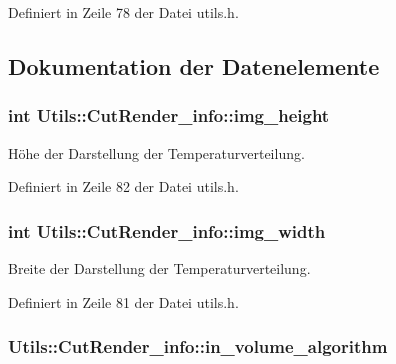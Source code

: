 Definiert in Zeile 78 der Datei utils.\-h.



\subsection{Dokumentation der Datenelemente}
\hypertarget{structUtils_1_1CutRender__info_abac1c3e4edb7183017ecfa7b69c40d25}{
\subsubsection[{img\-\_\-height}]{\setlength{\rightskip}{0pt plus 5cm}int Utils\-::\-Cut\-Render\-\_\-info\-::img\-\_\-height}}\label{structUtils_1_1CutRender__info_abac1c3e4edb7183017ecfa7b69c40d25}


Höhe der Darstellung der Temperaturverteilung. 



Definiert in Zeile 82 der Datei utils.\-h.

\hypertarget{structUtils_1_1CutRender__info_ac7a1e2c64129630affaf208808a190eb}{
\subsubsection[{img\-\_\-width}]{\setlength{\rightskip}{0pt plus 5cm}int Utils\-::\-Cut\-Render\-\_\-info\-::img\-\_\-width}}\label{structUtils_1_1CutRender__info_ac7a1e2c64129630affaf208808a190eb}


Breite der Darstellung der Temperaturverteilung. 



Definiert in Zeile 81 der Datei utils.\-h.

\hypertarget{structUtils_1_1CutRender__info_af2ee1118ac14a73a2a350a05102013ab}{
\subsubsection[{in\-\_\-volume\-\_\-algorithm}]{ Utils\-::\-Cut\-Render\-\_\-info\-::in\-\_\-volume\-\_\-algorithm}}\label{structUtils_1_1CutRender__info_af2ee1118ac14a73a2a350a05102013ab}


